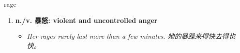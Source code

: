 
\begin{frame}
{\huge rage}
\begin{center}
\begin{enumerate}\Large
  \item \textbf{n./v. 暴怒: violent and uncontrolled anger}
  \begin{itemize}
    \item \em{\Large{Her rages rarely last more than a few minutes. 她的暴躁来得快去得也快。}}
  \end{itemize}
\end{enumerate}
\end{center}
\end{frame}
